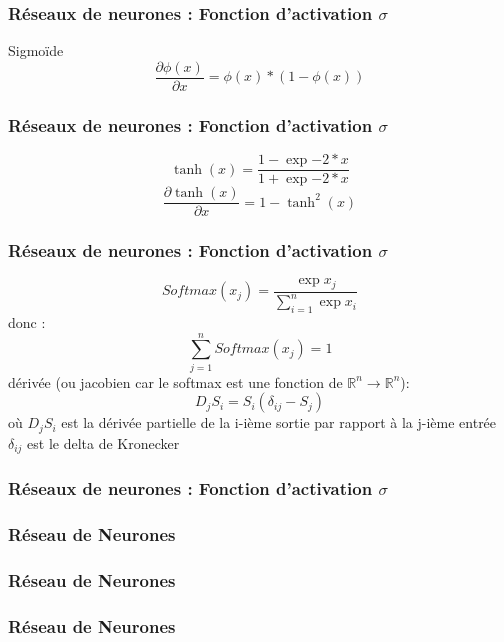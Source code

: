 \documentclass{formation}
\begin{document}
\begin{frame}
  \frametitle{Réseaux de neurones : Fonction d'activation $\sigma$}
  Sigmoïde
  \[
  \frac{\partial{\phi(x)}}{\partial{x}}=\phi(x)*(1-\phi(x))
  \]
\end{frame}

\begin{frame}
  \frametitle{Réseaux de neurones : Fonction d'activation $\sigma$}
  \[
  \tanh(x)=\frac{1-\exp{-2*x}}{1+\exp{-2*x}}
  \]
  \[
  \frac{\partial{\tanh(x)}}{\partial{x}}=1-\tanh^2(x)
  \]
\end{frame}

\begin{frame}
  \frametitle{Réseaux de neurones : Fonction d'activation $\sigma$}
  \[
  \mathit{Softmax}(x_j)=\frac{\exp{x_j}}{\sum_{i=1}^n{\exp{x_i}}}
  \]
  donc :
  \[
  \sum_{j=1}^n{\mathit{Softmax}(x_j)}=1
  \]
  dérivée (ou jacobien car le softmax est une fonction de $\mathbb{R}^n\rightarrow\mathbb{R}^n$):
  \[
  D_jS_i = S_i(\delta_{ij}-S_j)
  \]
  où
  $D_jS_i$ est la dérivée partielle de la i-ième sortie par rapport à la j-ième entrée
  \newline
  $\delta_{ij}$ est le delta de Kronecker
\end{frame}

\begin{frame}
  \frametitle{Réseaux de neurones : Fonction d'activation $\sigma$}
  \begin{minipage}[c]{0.39\linewidth}
  \end{minipage}\hfill
  \begin{minipage}[c]{0.59\linewidth}
  \end{minipage}\hfill
\end{frame}

\begin{frame}
  \frametitle{Réseau de Neurones}
\end{frame}

\begin{frame}
  \frametitle{Réseau de Neurones}
\end{frame}

\begin{frame}
  \frametitle{Réseau de Neurones}
\end{frame}
\end{document}
